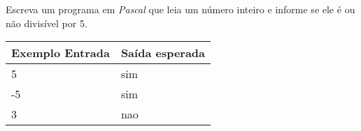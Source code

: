 \item Escreva um programa em \emph{Pascal} que leia um número inteiro e informe se ele é ou não divisível por 5.

\begin{center}
\begin{tabular}{|l|l|} \hline
Exemplo Entrada & Saída esperada \\ \hline
5                & sim               \\ \hline
-5                & sim               \\ \hline
3                &  nao              \\ \hline
\end{tabular}
\end{center}